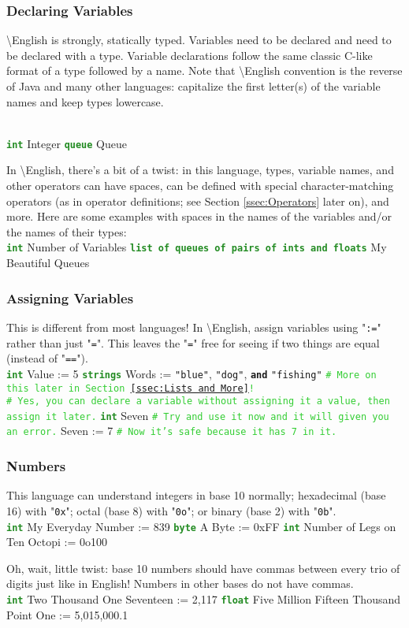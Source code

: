 \documentclass{article}
\newcommand{\name}{\textbackslash{}English}				%
\newcommand{\sssecl}[1]{\subsubsection{#1}\label{sssec:#1}}
\newcommand{\codecomment}[1]{\texttt{\textcolor{LimeGreen}{#1}}}
\newcommand{\commentline}[1]{\codecomment{\# #1}}
\newcommand{\type}[1]{\texttt{\textcolor{ForestGreen}{\textbf{#1}}}}
\newcommand{\common}[1]{\texttt{\textcolor{Mulberry}{\textbf{#1}}}}
\newcommand{\codestring}[1]{\texttt{\textcolor{NavyBlue}{"#1"}}}
\newenvironment{code}[0]
{\ttfamily{}				%
\setlength\parindent{0cm}	%
~\\}
{\setlength\parindent{1cm}
~\\}
\begin{document}
\sssecl{Declaring Variables}
\indent \name{} is strongly, statically typed. Variables need to be declared and need to be declared with a type. Variable declarations follow the same classic C-like format of a type followed by a name. Note that \name{} convention is the reverse of Java and many other languages: capitalize the first letter(s) of the variable names and keep types lowercase.

\begin{code}
\type{int} Integer
\type{queue} Queue
\end{code}

In \name{}, there's a bit of a twist: in this language, types, variable names, and other operators can have spaces, can be defined with special character-matching operators (as in operator definitions; see Section \ref{ssec:Operators} later on), and more. Here are some examples with spaces in the names of the variables and/or the names of their types:
\begin{code}
\type{int} Number of Variables
\type{list of queues of pairs of ints and floats} My Beautiful Queues
\end{code}

\sssecl{Assigning Variables}
\indent This is different from most languages! In \name{}, assign variables using "\texttt{:=}" rather than just "\texttt{=}". This leaves the "\texttt{=}" free for seeing if two things are equal (instead of "\texttt{==}").
\begin{code}
\type{int} Value := 5
\type{strings} Words := \codestring{blue}, \codestring{dog}, \common{and} \codestring{fishing} \commentline{More on this later in Section \ref{ssec:Lists and More}!}\\
\commentline{Yes, you can declare a variable without assigning it a value, then assign it later.}
\type{int} Seven	\commentline{Try and use it now and it will given you an error.}
Seven := 7	\commentline{Now it's safe because it has 7 in it.}
\end{code}

\sssecl{Numbers}
\indent This language can understand integers in base 10 normally; hexadecimal (base 16) with "\texttt{0x}"; octal (base 8) with "\texttt{0o}"; or binary (base 2) with "\texttt{0b}".
\begin{code}
\type{int} My Everyday Number := 839
\type{byte} A Byte := 0xFF
\type{int} Number of Legs on Ten Octopi := 0o100
\end{code}

\indent Oh, wait, little twist: base 10 numbers should have commas between every trio of digits just like in English! Numbers in other bases do not have commas.
\begin{code}
\type{int} Two Thousand One Seventeen := 2,117
\type{float} Five Million Fifteen Thousand Point One := 5,015,000.1
\end{code}
\end{document}
